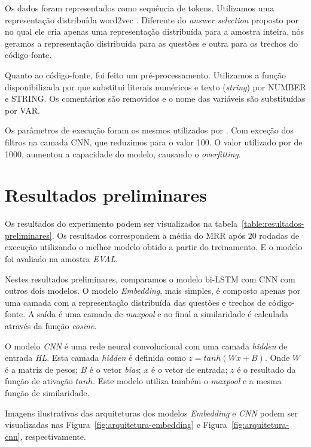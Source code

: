 \documentclass[12pt]{article}
\begin{document}
Os dados foram representados como sequência de tokens. Utilizamos uma representação distribuída word2vec \cite{mikolov-word2vec-2013}. Diferente do \textit{answer selection} proposto por \cite{tan-lstm-qa} no qual ele cria apenas uma representação distribuída para a amostra inteira, nós geramos a representação distribuída para as questões e outra para os trechos do código-fonte.

Quanto ao código-fonte, foi feito um pré-processamento. Utilizamos a função disponibilizada por \cite{Yao-staqc:2018} que substitui literais numéricos e texto (\textit{string}) por NUMBER e STRING. Os comentários são removidos e o nome das variáveis são substituídas por VAR.

Os parâmetros de execução foram os mesmos utilizados por \cite{tan-lstm-qa}. Com exceção dos filtros na camada CNN, que reduzimos para o valor 100. O valor utilizado por \cite{tan-lstm-qa} de 1000, aumentou a capacidade do modelo, causando o \textit{overfitting}.




\section{Resultados preliminares}\label{sec:resultados-preliminares}

Os resultados do experimento podem ser visualizados na tabela~\ref{table:resultados-preliminares}. Os resultados correspondem a média do MRR após 20 rodadas de execução utilizando o melhor modelo obtido a partir do treinamento. E o modelo foi avaliado na amostra \emph{EVAL}. 

Nestes resultados preliminares, comparamos o modelo bi-LSTM com CNN com outros dois modelos. O modelo \emph{Embedding}, mais simples, é composto apenas por uma camada com a representação distribuída das questões e trechos de código-fonte. A saída é uma camada de \textit{maxpool} e ao final a similaridade é calculada através da função \textit{cosine}. 

O modelo \emph{CNN} é uma rede neural convolucional com uma camada \textit{hidden} de entrada \emph{HL}. Esta camada \textit{hidden}  é definida como $z = tanh(Wx +B)$. Onde $W$ é a matriz de pesos; $B$ é o vetor \textit{bias}; $x$ é o vetor de entrada; $z$ é o resultado da função de ativação $tanh$.  Este modelo utiliza também o \textit{maxpool} e a mesma função de similaridade.

Imagens ilustrativas das arquiteturas dos modelos \emph{Embedding} e \emph{CNN} podem ser visualizadas nas Figura~\ref{fig:arquitetura-embedding} e Figura~\ref{fig:arquitetura-cnn}, respectivamente.
\end{document}
